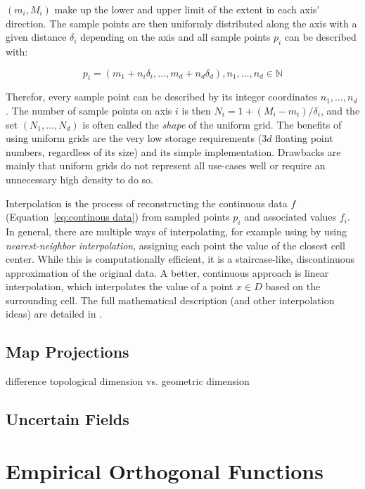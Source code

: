 $(m_i, M_i)$  make up the lower and upper limit of the extent in each axis' direction. 
The sample points are then uniformly distributed along the axis with a given distance $\delta_i$ depending on the axis and all sample points $p_i$ can be described with: 

\begin{equation}
  p_i = (m_1 + n_i\delta_i,\dots, m_d + n_d\delta_d), n_1, \dots, n_d \in \mathbb{N}
  \label{eq:smaple point uniform grid}
\end{equation}

Therefor, every sample point can be described by its integer coordinates $n_1, \dots, n_d$. 
The number of sample points on axis $i$ is then $N_i = 1 + (M_i - m_i)/\delta_i$, and the set $(N_1, \dots, N_d)$ is often called the \textit{shape} of the uniform grid.   
The benefits of using uniform grids are the very low storage requirements ($3d$ floating point numbers, regardless of its size) and its simple implementation. 
Drawbacks are mainly that uniform grids do not represent all use-cases well or require an unnecessary high density to do so. 


Interpolation is the process of reconstructing the continuous data $f$ (Equation~\ref{eq:continous data}) from sampled points $p_i$ and associated values $f_i$. 
In general, there are multiple ways of interpolating, for example using by using \textit{nearest-neighbor interpolation}, assigning each point the value of the closest cell center. 
While this is computationally efficient, it is a staircase-like, discontinuous approximation of the original data. 
A better, continuous approach is linear interpolation, which interpolates the value of a point $x \in D$ based on the surrounding cell. 
The full mathematical description (and other interpolation ideas) are detailed in . 

\subsection{Map Projections}

difference topological dimension vs. geometric dimension 



\subsection{Uncertain Fields}

\section{Empirical Orthogonal Functions}
\label{sec:eof}


